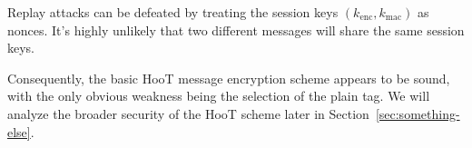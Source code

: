 Replay attacks can be defeated by treating the session keys $\left(k_{\mathrm{enc}}, k_{\mathrm{mac}}\right)$ as nonces. It's highly unlikely that two different messages will share the same session keys.

Consequently, the basic HooT message encryption scheme appears to be sound, with the only obvious weakness being the selection of the plain tag. We will analyze the broader security of the HooT scheme later in Section~\ref{sec:something-else}.
